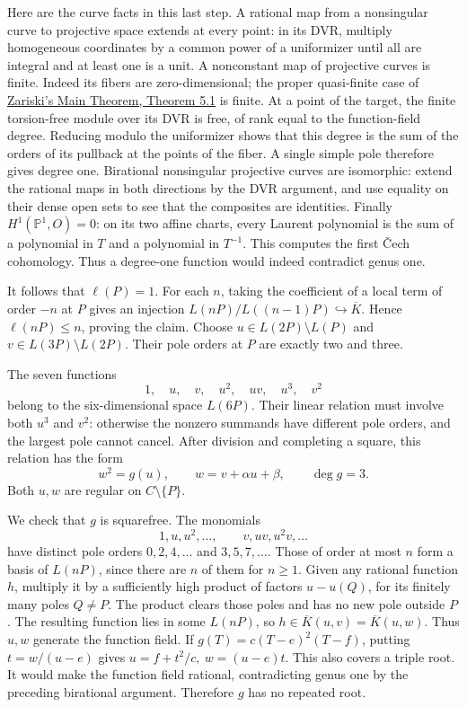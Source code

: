 \documentclass[
  11pt,
  a4paper,
]{article}
\begin{document}
Here are the curve facts in this last step. A rational map from a
nonsingular curve to projective space extends at every point: in its
DVR, multiply homogeneous coordinates by a common power of a uniformizer
until all are integral and at least one is a unit. A nonconstant map of
projective curves is finite. Indeed its fibers are zero-dimensional; the
proper quasi-finite case of
\href{https://kokunoyumeto.github.io/open-math-courses-public/courses/AG-MO/zariskis-main-theorem.html\#5-properness-and-normality}{Zariski's
Main Theorem, Theorem 5.1} is finite. At a point of the target, the
finite torsion-free module over its DVR is free, of rank equal to the
function-field degree. Reducing modulo the uniformizer shows that this
degree is the sum of the orders of its pullback at the points of the
fiber. A single simple pole therefore gives degree one. Birational
nonsingular projective curves are isomorphic: extend the rational maps
in both directions by the DVR argument, and use equality on their dense
open sets to see that the composites are identities. Finally
\(H^1(\mathbb P^1,O)=0\): on its two affine charts, every Laurent
polynomial is the sum of a polynomial in \(T\) and a polynomial in
\(T^{-1}\). This computes the first Čech cohomology. Thus a degree-one
function would indeed contradict genus one.

It follows that \(\ell(P)=1\). For each \(n\), taking the coefficient of
a local term of order \(-n\) at \(P\) gives an injection
\(L(nP)/L((n-1)P)\hookrightarrow\overline K\). Hence \(\ell(nP)\le n\),
proving the claim. Choose \(u\in L(2P)\setminus L(P)\) and
\(v\in L(3P)\setminus L(2P)\). Their pole orders at \(P\) are exactly
two and three.

The seven functions \[
1,\quad u,\quad v,\quad u^2,\quad uv,\quad u^3,\quad v^2
\] belong to the six-dimensional space \(L(6P)\). Their linear relation
must involve both \(u^3\) and \(v^2\): otherwise the nonzero summands
have different pole orders, and the largest pole cannot cancel. After
division and completing a square, this relation has the form \[
w^2=g(u),\qquad
w=v+\alpha u+\beta,\qquad \deg g=3.
\] Both \(u,w\) are regular on \(C\setminus\{P\}\).

We check that \(g\) is squarefree. The monomials \[
1,u,u^2,\ldots,\qquad v,uv,u^2v,\ldots
\] have distinct pole orders \(0,2,4,\ldots\) and \(3,5,7,\ldots\).
Those of order at most \(n\) form a basis of \(L(nP)\), since there are
\(n\) of them for \(n\ge1\). Given any rational function \(h\), multiply
it by a sufficiently high product of factors \(u-u(Q)\), for its
finitely many poles \(Q\ne P\). The product clears those poles and has
no new pole outside \(P\). The resulting function lies in some
\(L(nP)\), so \(h\in\overline K(u,v)=\overline K(u,w)\). Thus \(u,w\)
generate the function field. If \(g(T)=c(T-e)^2(T-f)\), putting
\(t=w/(u-e)\) gives \(u=f+t^2/c,\ w=(u-e)t\). This also covers a triple
root. It would make the function field rational, contradicting genus one
by the preceding birational argument. Therefore \(g\) has no repeated
root.
\end{document}
